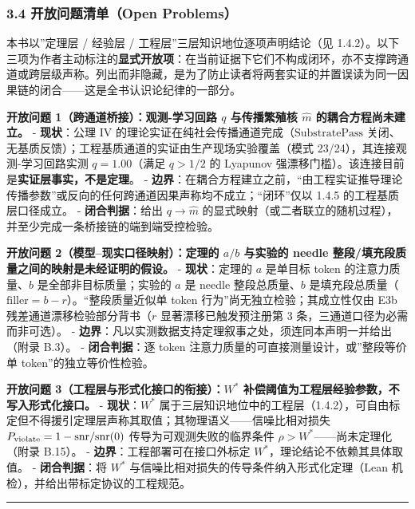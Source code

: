 \documentclass[
]{ctexart}
\renewcommand{\_}{\discretionary{}{}{\textunderscore}}
\renewcommand{\text}[1]{\textnormal{#1}}
\begin{document}
\subsubsection{3.4 开放问题清单（Open
Problems）}\label{ux5f00ux653eux95eeux9898ux6e05ux5355open-problems}

本书以''定理层 / 经验层 / 工程层''三层知识地位逐项声明结论（见
1.4.2）。以下三项为作者主动标注的\textbf{显式开放项}：在当前证据下它们不构成闭环，亦不支撑跨通道或跨层级声称。列出而非隐藏，是为了防止读者将两套实证的并置误读为同一因果链的闭合------这是全书认识论纪律的一部分。

\textbf{开放问题 1（跨通道桥接）：观测-学习回路 \(q\) 与传播繁殖核
\(\hat m\) 的耦合方程尚未建立。} - \textbf{现状}：公理 IV
的理论实证在纯社会传播通道完成（\(\mathrm{SubstratePass}\)
关闭、无基质反馈）；工程基质通道的实证由生产现场实验覆盖（模式
23/24），其连接观测-学习回路实测 \(q=1.00\)（满足 \(q>1/2\) 的 Lyapunov
强漂移门槛）。该连接目前是\textbf{实证层事实，不是定理}。 -
\textbf{边界}：在耦合方程建立之前，``由工程实证推导理论传播参数''或反向的任何跨通道因果声称均不成立；``闭环''仅以
1.4.5 的工程基质层口径成立。 - \textbf{闭合判据}：给出 \(q \to \hat m\)
的显式映射（或二者联立的随机过程），并至少完成一条桥接链的端到端受控检验。

\textbf{开放问题 2（模型--现实口径映射）：定理的 \(a/b\) 与实验的 needle
整段/填充段质量之间的映射是未经证明的假设。} - \textbf{现状}：定理的
\(a\) 是单目标 token 的注意力质量、\(b\) 是全部非目标质量；实验的 \(a\)
是 needle 整段总质量、\(b\)
是填充段总质量（\(\mathrm{filler}=b-r\)）。``整段质量近似单 token
行为''尚无独立检验；其成立性仅由 E3b 残差通道漂移检验部分背书（\(r\)
显著漂移已触发预注册第 3 条，三通道口径为必需而非可选）。 -
\textbf{边界}：凡以实测数据支持定理叙事之处，须连同本声明一并给出（附录
B.3）。 - \textbf{闭合判据}：逐 token
注意力质量的可直接测量设计，或''整段等价单 token''的独立等价性检验。

\textbf{开放问题 3（工程层与形式化接口的衔接）：\(W^*\)
补偿阈值为工程层经验参数，不写入形式化接口。} - \textbf{现状}：\(W^*\)
属于三层知识地位中的工程层（1.4.2），可自由标定但不得援引定理层声称其取值；其物理语义------信噪比相对损失
\(P_{\text{violate}}=1-\mathrm{snr}/\mathrm{snr}(0)\)
传导为可观测失败的临界条件 \(\rho>W^*\)------尚未定理化（附录 B.15）。 -
\textbf{边界}：工程部署可在接口外标定
\(W^*\)，理论结论不依赖其具体取值。 - \textbf{闭合判据}：将 \(W^*\)
与信噪比相对损失的传导条件纳入形式化定理（Lean
机检），并给出带标定协议的工程规范。

\begin{center}\rule{0.5\linewidth}{0.5pt}\end{center}
\end{document}
